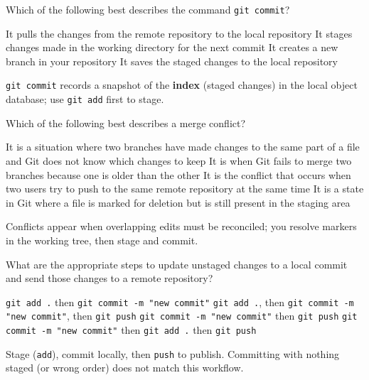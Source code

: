 \question[4]
Which of the following best describes the command \texttt{git commit}?
\begin{choices}
  \choice It pulls the changes from the remote repository to the local repository
  \choice It stages changes made in the working directory for the next commit
  \choice It creates a new branch in your repository
  \CorrectChoice It saves the staged changes to the local repository
\end{choices}
\begin{solution}
  \texttt{git commit} records a snapshot of the \textbf{index} (staged changes) in the local object database; use \texttt{git add} first to stage.
\end{solution}


\newpage


\question[4]
Which of the following best describes a merge conflict?
\begin{choices}
  \CorrectChoice It is a situation where two branches have made changes to the same part of a file and Git does not know which changes to keep
  \choice It is when Git fails to merge two branches because one is older than the other
  \choice It is the conflict that occurs when two users try to push to the same remote repository at the same time
  \choice It is a state in Git where a file is marked for deletion but is still present in the staging area
\end{choices}
\begin{solution}
  Conflicts appear when overlapping edits must be reconciled; you resolve markers in the working tree, then stage and commit.
\end{solution}

\question[4]
What are the appropriate steps to update unstaged changes to a local commit and send those changes to a remote repository?
\begin{choices}
  \choice \texttt{git add .} then \texttt{git commit -m "new commit"}
  \CorrectChoice \texttt{git add .}, then \texttt{git commit -m "new commit"}, then \texttt{git push}
  \choice \texttt{git commit -m "new commit"} then \texttt{git push}
  \choice \texttt{git commit -m "new commit"} then \texttt{git add .} then \texttt{git push}
\end{choices}
\begin{solution}
  Stage (\texttt{add}), commit locally, then \texttt{push} to publish. Committing with nothing staged (or wrong order) does not match this workflow.
\end{solution}

